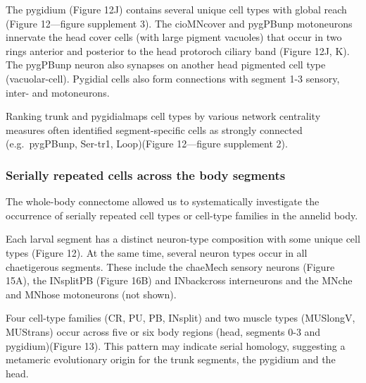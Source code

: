 \documentclass[
  11pt,
]{article}
\begin{document}
The pygidium (Figure 12J) contains several unique cell types with global
reach (Figure 12---figure supplement 3). The cioMNcover and pygPBunp
motoneurons innervate the head cover cells (with large pigment vacuoles)
that occur in two rings anterior and posterior to the head protoroch
ciliary band (Figure 12J, K). The pygPBunp neuron also synapses on
another head pigmented cell type (vacuolar-cell). Pygidial cells also
form connections with segment 1-3 sensory, inter- and motoneurons.

Ranking trunk and pygidialmaps cell types by various network centrality
measures often identified segment-specific cells as strongly connected
(e.g.~pygPBunp, Ser-tr1, Loop)(Figure 12---figure supplement 2).

\subsubsection{Serially repeated cells across the body
segments}\label{serially-repeated-cells-across-the-body-segments}

The whole-body connectome allowed us to systematically investigate the
occurrence of serially repeated cell types or cell-type families in the
annelid body.

Each larval segment has a distinct neuron-type composition with some
unique cell types (Figure 12). At the same time, several neuron types
occur in all chaetigerous segments. These include the chaeMech sensory
neurons (Figure 15A), the INsplitPB (Figure 16B) and INbackcross
interneurons and the MNche and MNhose motoneurons (not shown).

Four cell-type families (CR, PU, PB, INsplit) and two muscle types
(MUSlongV, MUStrans) occur across five or six body regions (head,
segments 0-3 and pygidium)(Figure 13). This pattern may indicate serial
homology, suggesting a metameric evolutionary origin for the trunk
segments, the pygidium and the head.
\end{document}

